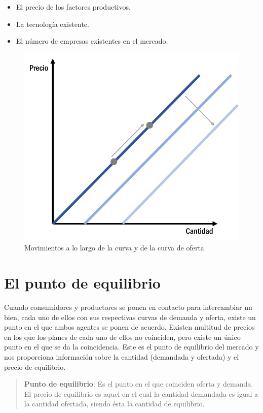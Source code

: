 \documentclass[
]{krantz}
\providecommand{\tightlist}{%
  \setlength{\itemsep}{0pt}\setlength{\parskip}{0pt}}
\begin{document}
\begin{itemize}
\tightlist
\item
  El precio de los factores productivos.
\item
  La tecnología existente.
\item
  El número de empresas existentes en el mercado.
\end{itemize}

\begin{figure}

{\centering \includegraphics[width=0.5\linewidth]{images/12a-04} 

}

\caption{Movimientos a lo largo de la curva y de la curva de oferta}\label{fig:12a-04}
\end{figure}

\hypertarget{el-punto-de-equilibrio}{%
\section{El punto de equilibrio}\label{el-punto-de-equilibrio}}

Cuando consumidores y productores se ponen en contacto para intercambiar un bien, cada uno de ellos con sus respectivas curvas de demanda y oferta, existe un punto en el que ambos agentes se ponen de acuerdo. Existen multitud de precios en los que los planes de cada uno de ellos no coinciden, pero existe un único punto en el que se da la coincidencia. Este es el punto de equilibrio del mercado y nos proporciona información sobre la cantidad (demandada y ofertada) y el precio de equilibrio.

\begin{quote}
\textbf{Punto de equilibrio}:
Es el punto en el que coinciden oferta y demanda. El precio de equilibrio es aquel en el cual la cantidad demandada es igual a la cantidad ofertada, siendo ésta la cantidad de equilibrio.
\end{quote}
\end{document}
